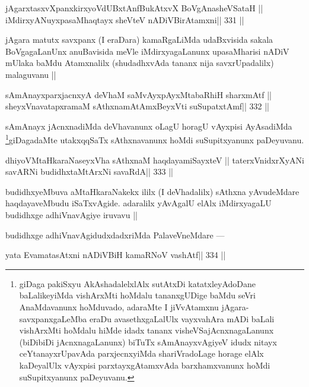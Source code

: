 \begin{shl}
jAgarxtasxvXpanxkirxyoVdUBxtAnfBukAtxvX BoVgAnasheVSataH ||
iMdirxyANuyxpasaMhaqtayx sheVteV nADiVBirAtamxni\hfill || 331 ||
\end{shl}

\begin{artha}
jAgara matutx savxpanx (I eraDara) kamaRgaLiMda udaBxvisida sakala BoVgagaLanUnx anuBavisida meVle iMdirxyagaLanunx upasaMharisi nADiV mUlaka baMdu Atamxnalilx (shudadhxvAda tananx nija savxrUpadalilx) malaguvanu ||
\end{artha}

\begin{shl}
sAmAnayxparxjacnxyA deVhaM saMvAyxpAyxMtabaRhiH sharxmAtf ||
sheyxVnavatapxramaM sAthxnamAtAmx\s BeyxVti suSupatxtAmf\hfill || 332 ||
\end{shl}

\begin{artha}
sAmAnayx jAcnxnadiMda deVhavanunx oLagU horagU vAyxpisi AyAsadiMda 
\footnote[1]{giDaga pakiSxyu AkAshadalelxlAlx sutAtxDi katatxleyAdoDane 
baLalikeyiMda vishArxMti hoMdalu tananxgUDige baMdu seVri AnaMdavanunx 
hoMduvado, adaraMte I jiVvAtamxnu jAgara-savxpanxgaLeMba eraDu avasethxgaLalUlx vayxvahAra mADi baLali vishArxMti hoMdalu hiMde idadx tananx visheVSajAcnxnagaLanunx (biDibiDi jAcnxnagaLanunx) biTuTx sAmAnayxvAgiyeV idudx nitayx ceYtanayxrUpavAda parxjecnxyiMda shariVradoLage horage elAlx kaDeyalUlx vAyxpisi parxtayxgAtamxvAda barxhamxvanunx hoMdi suSupitxyanunx paDeyuvanu.}giDagadaMte utakxqqSaTx sAthxnavanunx hoMdi suSupitxyanunx paDeyuvanu.
\end{artha}

\begin{shl}
dhiyoV\s MtaHkaraNaseyxVha sAthxnaM haqdayamiSayxteV ||
taterxVnidxrXyANi savARNi budidhxtaMtArxNi savaRdA\hfill || 333 ||
\end{shl}

\begin{artha}
budidhxyeMbuva aMtaHkaraNakekx ililx (I deVhadalilx) sAthxna 
yAvudeMdare haqdayaveMbudu iSaTxvAgide. adaralilx yAvAgalU elAlx iMdirxyagaLU budidhxge adhiVnavAgiye iruvavu ||
\end{artha}

\begin{artha}
budidhxge adhiVnavAgidudxdadxriMda PalaveVneMdare ---
\end{artha}

\begin{shl}
yata EvamatasAtxni nADiVBiH kamaRNoV vashAtf\hfill || 334 ||
\end{shl}

